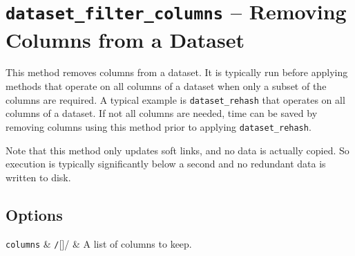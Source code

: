 




\clearpage
\section{\texttt{dataset\_filter\_columns} -- Removing Columns from a Dataset}

This method removes columns from a dataset.  It is typically run
before applying methods that operate on all columns of a dataset when
only a subset of the columns are required.  A typical example is
\texttt{dataset\_rehash} that operates on all columns of a dataset.
If not all columns are needed, time can be saved by removing columns
using this method prior to applying \texttt{dataset\_rehash}.

Note that this method only updates soft links, and no data is actually
copied.  So execution is typically significantly below a second and no
redundant data is written to disk.

\subsection*{Options}
\starttable
  \RP \texttt{columns} & \texttt/[]/ & A list of columns to
  keep.\\[1ex]
\stoptable






